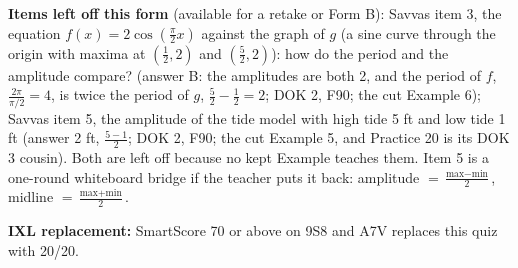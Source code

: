 \documentclass[11pt]{article}
\begin{document}
\textbf{Items left off this form} (available for a retake or Form B): Savvas item 3, the equation $f(x)=2\cos\left(\frac{\pi}{2}x\right)$ against the graph of $g$ (a sine curve through the origin with maxima at $\left(\frac12,2\right)$ and $\left(\frac52,2\right)$): how do the period and the amplitude compare? (answer B: the amplitudes are both 2, and the period of $f$, $\frac{2\pi}{\pi/2}=4$, is twice the period of $g$, $\frac52-\frac12=2$; DOK 2, F90; the cut Example 6); Savvas item 5, the amplitude of the tide model with high tide 5 ft and low tide 1 ft (answer 2 ft, $\frac{5-1}{2}$; DOK 2, F90; the cut Example 5, and Practice 20 is its DOK 3 cousin). Both are left off because no kept Example teaches them. Item 5 is a one-round whiteboard bridge if the teacher puts it back: amplitude $=\frac{\text{max}-\text{min}}{2}$, midline $=\frac{\text{max}+\text{min}}{2}$.

\textbf{IXL replacement:} SmartScore 70 or above on 9S8 and A7V replaces this quiz with 20/20.
\end{document}
